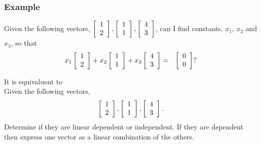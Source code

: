 {\begin{frame}
{  %


        \vfill


    }\fi
  

\end{frame}
}

%  
%
%

\begin{frame}
  \frametitle{Example}

  Given the following vectors, $ \vecTwo{1}{2}, \vecTwo{1}{1},  \vecTwo{4}{3}$, 
  can I find constants, $x_1$, $x_2$ and $x_3$, so that
  \begin{eqnarray*}
    x_1 \vecTwo{1}{2} + x_2 \vecTwo{1}{1}  + x_3 \vecTwo{4}{3} & 
    = &  \vecTwo{0}{0}?
  \end{eqnarray*}  

   {\color{red}It is equivaluent to }\\
   
   {\color{blue} 
   Given the following vectors, 
   $$ \vecTwo{1}{2}, \vecTwo{1}{1},  \vecTwo{4}{3}.$$   
   Determine if they are linear dependent or independent. If they are dependent
   then express one vector as a linear combination of the others.  
   }
\end{frame}

